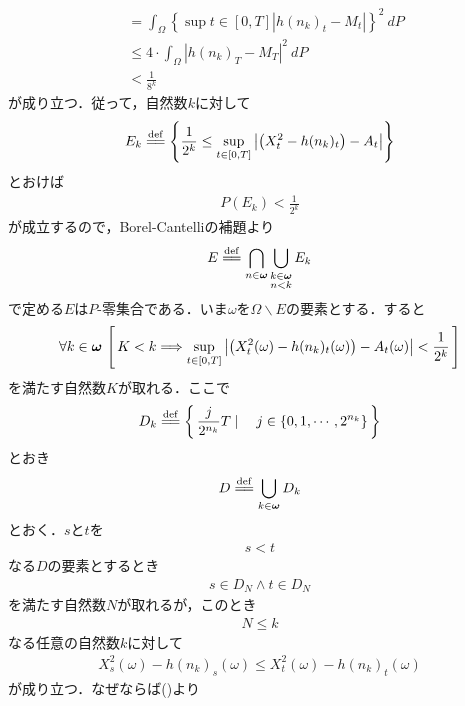 \begin{sketch}
\begin{description}
\begin{align}
					&= \int_\Omega \left\{\sup{t \in [0,T]}{\left|h(n_k)_t - M_t\right|}\right\}^2\ dP \\
					&\leq 4 \cdot \int_\Omega \left|h(n_k)_T - M_T\right|^2\ dP \\
					&< \frac{1}{8^k}
				\end{align}
				が成り立つ．従って，自然数$k$に対して
				\begin{align}
					E_k \defeq \left\{ \frac{1}{2^k} \leq \sup{t \in [0,T]}{\left|\left(X^2_t - h(n_k)_t\right) - A_t\right|} \right\}
				\end{align}
				とおけば
				\begin{align}
					P(E_k) < \frac{1}{2^k}
				\end{align}
				が成立するので，Borel-Cantelliの補題より
				\begin{align}
					E \defeq \bigcap_{n \in \Natural} \bigcup_{\substack{k \in \Natural \\ n < k}} E_k
				\end{align}
				で定める$E$は$P$-零集合である．いま$\omega$を$\Omega \backslash E$の要素とする．すると
				\begin{align}
					\forall k \in {\boldsymbol \omega}\,
					\left[\, K < k \Longrightarrow \operatorname*{sup}_{t \in [0,T]} \left|\left(X^2_t(\omega) - h(n_k)_t(\omega)\right) - A_t(\omega)\right| < \frac{1}{2^k}\, \right]
					\label{fom:thm_decomposition_of_square_integrable_martingales_4}
				\end{align}
				を満たす自然数$K$が取れる．ここで
				\begin{align}
					D_k \defeq \Set{\frac{j}{2^{n_k}}T}{j \in \{0,1,\cdots,2^{n_k}\}}
				\end{align}
				とおき
				\begin{align}
					D \defeq \bigcup_{k \in \Natural} D_k
				\end{align}
				とおく．$s$と$t$を
				\begin{align}
					s < t
				\end{align}
				なる$D$の要素とするとき
				\begin{align}
					s \in D_N \wedge t \in D_N
				\end{align}
				を満たす自然数$N$が取れるが，このとき
				\begin{align}
					N \leq k
				\end{align}
				なる任意の自然数$k$に対して
				\begin{align}
					X^2_s(\omega) - h(n_k)_s(\omega) \leq X^2_t(\omega) - h(n_k)_t(\omega)
				\end{align}
				が成り立つ．なぜならば()より

\end{description}
\end{sketch}
